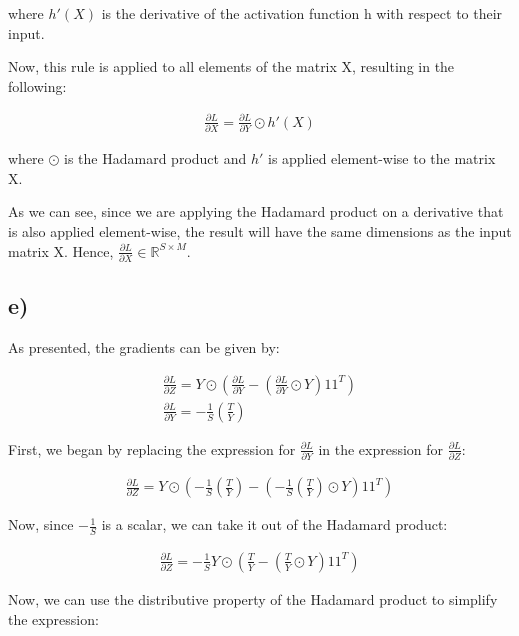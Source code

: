 \documentclass{article}
\begin{document}
where $h'(X)$ is the derivative of the activation function h with respect to their input. 

Now, this rule is applied to all elements of the matrix X, resulting in the following:

\begin{align*}
    \frac{\partial L}{\partial X} = \frac{\partial L}{\partial Y} \odot h'(X)
\end{align*}

where $\odot$ is the Hadamard product and $h'$ is applied element-wise to the matrix X.

As we can see, since we are applying the Hadamard product on a derivative that is also applied element-wise,
the result will have the same dimensions as the input matrix X. Hence, $\frac{\partial L}{\partial X} \in \mathbb{R}^{S \times M}$.

\newpage
\subsection*{e)}

As presented, the gradients can be given by: 

\begin{align*}
    \frac{\partial L}{\partial Z} = Y \odot \left( \frac{\partial L}{\partial Y} - \left( \frac{\partial L}{\partial Y} \odot Y \right) 1 1^T \right) \\
    \frac{\partial L}{\partial Y} = - \frac{1}{S} \left( \frac{T}{Y} \right)
\end{align*}

First, we began by replacing the expression for $\frac{\partial L}{\partial Y}$ in the expression for $\frac{\partial L}{\partial Z}$:

\begin{align*}
    \frac{\partial L}{\partial Z} = Y \odot \left( - \frac{1}{S} \left( \frac{T}{Y} \right) - \left( - \frac{1}{S} \left( \frac{T}{Y} \right) \odot Y \right) 1 1^T \right)
\end{align*}

Now, since $- \frac{1}{S}$ is a scalar, we can take it out of the Hadamard product:

\begin{align*}
    \frac{\partial L}{\partial Z} = - \frac{1}{S} Y \odot \left( \frac{T}{Y} - \left( \frac{T}{Y} \odot Y \right) 1 1^T \right)
\end{align*}

Now, we can use the distributive property of the Hadamard product to simplify the expression:
\end{document}
